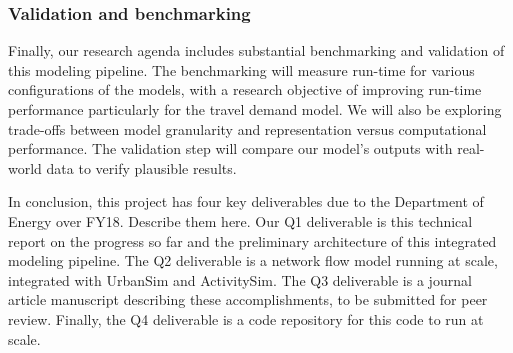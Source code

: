 \subsubsection{Validation and benchmarking}

Finally, our research agenda includes substantial benchmarking and validation of this modeling pipeline. The benchmarking will measure run-time for various configurations of the models, with a research objective of improving run-time performance particularly for the travel demand model. We will also be exploring trade-offs between model granularity and representation versus computational performance. The validation step will compare our model's outputs with real-world data to verify plausible results.

\bigskip
In conclusion, this project has four key deliverables due to the Department of Energy over FY18. Describe them here. Our Q1 deliverable is this technical report on the progress so far and the preliminary architecture of this integrated modeling pipeline. The Q2 deliverable is a network flow model running at scale, integrated with UrbanSim and ActivitySim. The Q3 deliverable is a journal article manuscript describing these accomplishments, to be submitted for peer review. Finally, the Q4 deliverable is a code repository for this code to run at scale.
